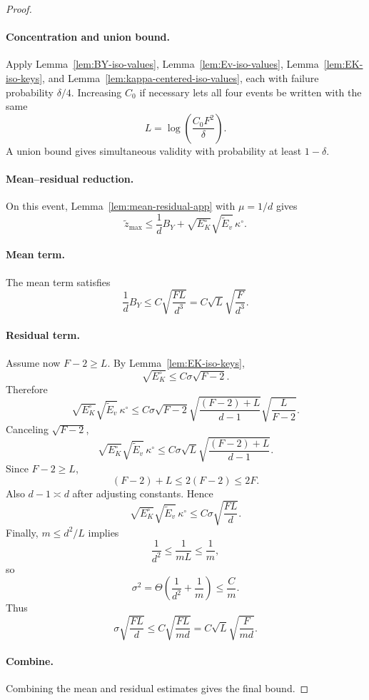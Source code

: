 \begin{proof}
\paragraph{Concentration and union bound.}
Apply Lemma~\ref{lem:BY-iso-values}, Lemma~\ref{lem:Ev-iso-values},
Lemma~\ref{lem:EK-iso-keys}, and Lemma~\ref{lem:kappa-centered-iso-values}, each
with failure probability \(\delta/4\). Increasing \(C_0\) if necessary lets all four
events be written with the same
\[
L=\log\left(\frac{C_0F^2}{\delta}\right).
\]
A union bound gives simultaneous validity with probability at least \(1-\delta\).

\paragraph{Mean--residual reduction.}
On this event, Lemma~\ref{lem:mean-residual-app} with \(\mu=1/d\) gives
\[
\widetilde z_{\max}
\le
\frac1dB_Y+
\sqrt{E_K^\circ}\sqrt{\widetilde E_v}\,\kappa^\circ.
\]

\paragraph{Mean term.}
The mean term satisfies
\[
\frac1dB_Y
\le
C\sqrt{\frac{FL}{d^3}}
=
C\sqrt L\sqrt{\frac{F}{d^3}}.
\]

\paragraph{Residual term.}
Assume now \(F-2\ge L\). By Lemma~\ref{lem:EK-iso-keys},
\[
\sqrt{E_K^\circ}\le C\sigma\sqrt{F-2}.
\]
Therefore
\[
\sqrt{E_K^\circ}\sqrt{\widetilde E_v}\,\kappa^\circ
\le
C\sigma\sqrt{F-2}
\sqrt{\frac{(F-2)+L}{d-1}}
\sqrt{\frac{L}{F-2}}.
\]
Canceling \(\sqrt{F-2}\),
\[
\sqrt{E_K^\circ}\sqrt{\widetilde E_v}\,\kappa^\circ
\le
C\sigma\sqrt L
\sqrt{\frac{(F-2)+L}{d-1}}.
\]
Since \(F-2\ge L\),
\[
(F-2)+L\le2(F-2)\le2F.
\]
Also \(d-1\asymp d\) after adjusting constants. Hence
\[
\sqrt{E_K^\circ}\sqrt{\widetilde E_v}\,\kappa^\circ
\le
C\sigma\sqrt{\frac{FL}{d}}.
\]
Finally, \(m\le d^2/L\) implies
\[
\frac1{d^2}\le \frac1{mL}\le \frac1m,
\]
so
\[
\sigma^2=\Theta\left(\frac1{d^2}+\frac1m\right)
\le
\frac{C}{m}.
\]
Thus
\[
\sigma\sqrt{\frac{FL}{d}}
\le
C\sqrt{\frac{FL}{md}}
=
C\sqrt L\sqrt{\frac{F}{md}}.
\]

\paragraph{Combine.}
Combining the mean and residual estimates gives the final bound.
\end{proof}





